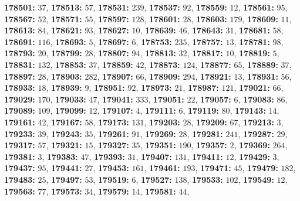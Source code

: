 \textsf{\bfseries 178501:} $37$, \textsf{\bfseries 178513:} $57$, \textsf{\bfseries 178531:} $239$, \textsf{\bfseries 178537:} $92$, \textsf{\bfseries 178559:} $12$, \textsf{\bfseries 178561:} $95$, \textsf{\bfseries 178567:} $52$, \textsf{\bfseries 178571:} $55$, \textsf{\bfseries 178597:} $128$, \textsf{\bfseries 178601:} $28$, \textsf{\bfseries 178603:} $179$, \textsf{\bfseries 178609:} $11$, \textsf{\bfseries 178613:} $84$, \textsf{\bfseries 178621:} $93$, \textsf{\bfseries 178627:} $10$, \textsf{\bfseries 178639:} $46$, \textsf{\bfseries 178643:} $31$, \textsf{\bfseries 178681:} $58$, \textsf{\bfseries 178691:} $116$, \textsf{\bfseries 178693:} $5$, \textsf{\bfseries 178697:} $6$, \textsf{\bfseries 178753:} $235$, \textsf{\bfseries 178757:} $13$, \textsf{\bfseries 178781:} $98$, \textsf{\bfseries 178793:} $20$, \textsf{\bfseries 178799:} $28$, \textsf{\bfseries 178807:} $94$, \textsf{\bfseries 178813:} $32$, \textsf{\bfseries 178817:} $10$, \textsf{\bfseries 178819:} $5$, \textsf{\bfseries 178831:} $132$, \textsf{\bfseries 178853:} $37$, \textsf{\bfseries 178859:} $42$, \textsf{\bfseries 178873:} $124$, \textsf{\bfseries 178877:} $65$, \textsf{\bfseries 178889:} $37$, \textsf{\bfseries 178897:} $28$, \textsf{\bfseries 178903:} $282$, \textsf{\bfseries 178907:} $66$, \textsf{\bfseries 178909:} $294$, \textsf{\bfseries 178921:} $13$, \textsf{\bfseries 178931:} $56$, \textsf{\bfseries 178933:} $18$, \textsf{\bfseries 178939:} $9$, \textsf{\bfseries 178951:} $92$, \textsf{\bfseries 178973:} $21$, \textsf{\bfseries 178987:} $121$, \textsf{\bfseries 179021:} $66$, \textsf{\bfseries 179029:} $170$, \textsf{\bfseries 179033:} $47$, \textsf{\bfseries 179041:} $333$, \textsf{\bfseries 179051:} $22$, \textsf{\bfseries 179057:} $6$, \textsf{\bfseries 179083:} $86$, \textsf{\bfseries 179089:} $109$, \textsf{\bfseries 179099:} $12$, \textsf{\bfseries 179107:} $4$, \textsf{\bfseries 179111:} $6$, \textsf{\bfseries 179119:} $80$, \textsf{\bfseries 179143:} $14$, \textsf{\bfseries 179161:} $42$, \textsf{\bfseries 179167:} $58$, \textsf{\bfseries 179173:} $131$, \textsf{\bfseries 179203:} $28$, \textsf{\bfseries 179209:} $67$, \textsf{\bfseries 179213:} $3$, \textsf{\bfseries 179233:} $39$, \textsf{\bfseries 179243:} $35$, \textsf{\bfseries 179261:} $91$, \textsf{\bfseries 179269:} $28$, \textsf{\bfseries 179281:} $241$, \textsf{\bfseries 179287:} $29$, \textsf{\bfseries 179317:} $57$, \textsf{\bfseries 179321:} $15$, \textsf{\bfseries 179327:} $35$, \textsf{\bfseries 179351:} $190$, \textsf{\bfseries 179357:} $2$, \textsf{\bfseries 179369:} $264$, \textsf{\bfseries 179381:} $3$, \textsf{\bfseries 179383:} $47$, \textsf{\bfseries 179393:} $31$, \textsf{\bfseries 179407:} $131$, \textsf{\bfseries 179411:} $12$, \textsf{\bfseries 179429:} $3$, \textsf{\bfseries 179437:} $95$, \textsf{\bfseries 179441:} $27$, \textsf{\bfseries 179453:} $161$, \textsf{\bfseries 179461:} $193$, \textsf{\bfseries 179471:} $45$, \textsf{\bfseries 179479:} $182$, \textsf{\bfseries 179483:} $25$, \textsf{\bfseries 179497:} $53$, \textsf{\bfseries 179519:} $6$, \textsf{\bfseries 179527:} $138$, \textsf{\bfseries 179533:} $102$, \textsf{\bfseries 179549:} $12$, \textsf{\bfseries 179563:} $77$, \textsf{\bfseries 179573:} $34$, \textsf{\bfseries 179579:} $14$, \textsf{\bfseries 179581:} $44$, 
